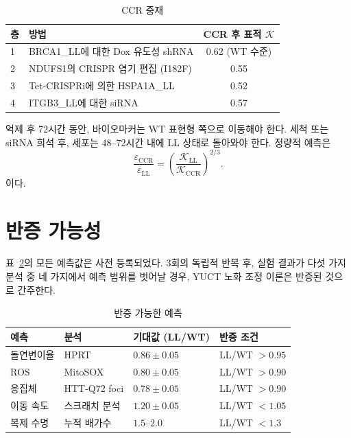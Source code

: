 \documentclass[12pt,a4paper]{article}
\newcommand{\REL}{\mathcal{K}}          %
\begin{document}
	\begin{table}[H]
		\centering
		\caption{CCR 중재}
		\label{tab:CCR}
		\begin{tabular}{@{}llc@{}}
			\toprule
			\textbf{층} & \textbf{방법} & \textbf{CCR 후 표적 \(\REL\)} \\
			\midrule
			1 & BRCA1\_LL에 대한 Dox 유도성 shRNA & 0.62 (WT 수준) \\
			2 & NDUFS1의 CRISPR 염기 편집 (I182F)   & 0.55 \\
			3 & Tet‑CRISPRi에 의한 HSPA1A\_LL       & 0.52 \\
			4 & ITGB3\_LL에 대한 siRNA            & 0.57 \\
			\bottomrule
		\end{tabular}
	\end{table}
	
	억제 후 72시간 동안, 바이오마커는 WT 표현형 쪽으로 이동해야 한다. 세척 또는 siRNA 희석 후, 세포는 48–72시간 내에 LL 상태로 돌아와야 한다. 정량적 예측은
	\[
	\frac{\varepsilon_{\mathrm{CCR}}}{\varepsilon_{\mathrm{LL}}} = \left(\frac{\REL_{\mathrm{LL}}}{\REL_{\mathrm{CCR}}}\right)^{2/3}.
	\]
	이다.
	
	\section{반증 가능성}
	\label{sec:falsifiability}
	표~\ref{tab:predictions}의 모든 예측값은 사전 등록되었다. 3회의 독립적 반복 후, 실험 결과가 다섯 가지 분석 중 네 가지에서 예측 범위를 벗어날 경우, YUCT 노화 조정 이론은 반증된 것으로 간주한다.
	
	\begin{table}[H]
		\centering
		\caption{반증 가능한 예측}
		\label{tab:predictions}
		\begin{tabular}{@{}llll@{}}
			\toprule
			\textbf{예측} & \textbf{분석} & \textbf{기대값 (LL/WT)} & \textbf{반증 조건} \\
			\midrule
			돌연변이율       & HPRT           & \(0.86 \pm 0.05\) & LL/WT \(> 0.95\) \\
			ROS              & MitoSOX        & \(0.80 \pm 0.05\) & LL/WT \(> 0.90\) \\
			응집체           & HTT‑Q72 foci   & \(0.78 \pm 0.05\) & LL/WT \(> 0.90\) \\
			이동 속도        & 스크래치 분석  & \(1.20 \pm 0.05\) & LL/WT \(< 1.05\) \\
			복제 수명        & 누적 배가수    & \(1.5\)–\(2.0\)   & LL/WT \(< 1.3\) \\
			\bottomrule
		\end{tabular}
	\end{table}
	
\end{document}
